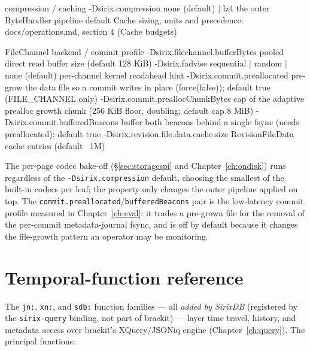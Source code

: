 \documentclass[11pt,a4paper,oneside]{report}
\newcommand{\dcap}[1]{\par\vspace{1pt}\noindent{\small\sffamily\bfseries\color{slate}#1}\par\vspace{-2pt}}
\theoremstyle{sirixthm}
\newcommand{\code}[1]{\texttt{#1}}
\begin{document}
\dcap{Selected \texttt{-D} system properties}
\begin{diagramS}
compression / caching
  -Dsirix.compression               none (default) | lz4    the outer ByteHandler pipeline default
  Cache sizing, units and precedence: docs/operations.md, section 4 (Cache budgets)

FileChannel backend / commit profile
  -Dsirix.filechannel.bufferBytes   pooled direct read buffer size (default 128 KiB)
  -Dsirix.fadvise                   sequential | random | none (default)  per-channel kernel readahead hint
  -Dsirix.commit.preallocated       pre-grow the data file so a commit writes in place (force(false)); default true (FILE_CHANNEL only)
  -Dsirix.commit.preallocChunkBytes cap of the adaptive prealloc growth chunk (256 KiB floor, doubling; default cap 8 MiB)
  -Dsirix.commit.bufferedBeacons    buffer both beacons behind a single fsync (needs preallocated); default true
  -Dsirix.revision.file.data.cache.size   RevisionFileData cache entries (default ~1M)

\end{diagramS}

\noindent The per-page codec bake-off (\S\ref{sec:storagespi} and Chapter~\ref{ch:ondisk}) runs
regardless of the \code{-Dsirix.compression} default, choosing the smallest of the built-in codecs per
leaf; the property only changes the outer pipeline applied on top. The
\code{commit.preallocated}/\allowbreak\code{bufferedBeacons} pair is the low-latency commit profile measured in
Chapter~\ref{ch:eval}: it trades a pre-grown file for the removal of the per-commit metadata-journal
fsync, and is off by default because it changes the file-growth pattern an operator may be monitoring.

\section{Temporal-function reference}
\label{app:funcs}

The \code{jn:}, \code{xn:}, and \code{sdb:} function families --- all \emph{added by SirixDB} (registered
by the \code{sirix-query} binding, not part of brackit) --- layer time travel, history, and metadata access
over brackit's XQuery/JSONiq engine (Chapter~\ref{ch:query}). The principal functions:
\end{document}
